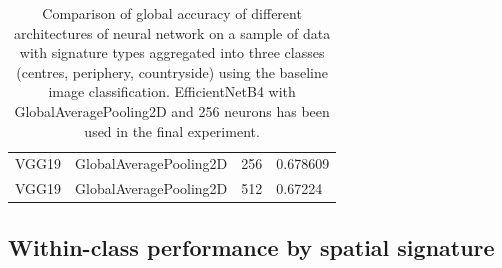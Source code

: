 \begin{table}
\begin{tabular}{llll}
           VGG19 &   GlobalAveragePooling2D &                    256 &  0.678609 \\
           VGG19 &   GlobalAveragePooling2D &                    512 &   0.67224 \\
    \bottomrule
    \end{tabular}
\caption{\label{tab:app_nns}\footnotesize Comparison of global accuracy of different
architectures of neural network on a sample of data with signature types aggregated into
three classes (centres, periphery, countryside) using the baseline image classification.
EfficientNetB4 with GlobalAveragePooling2D and 256 neurons has been used in the final
experiment.}
\end{table}


\pagebreak

\subsection{Within-class performance by spatial signature}
\label{sec:appendixB}

